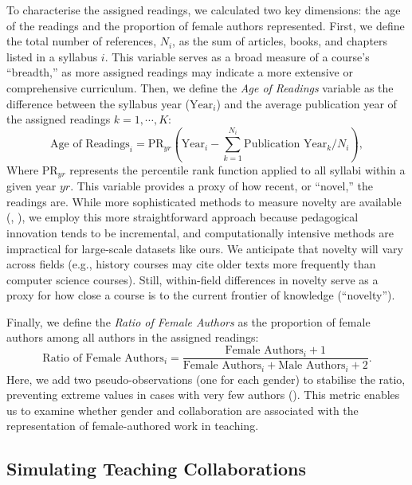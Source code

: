 \documentclass[
  12pt,
]{article}
\begin{document}
To characterise the assigned readings, we calculated two key dimensions: the age of the readings and the proportion of female authors represented. First, we define the total number of references, \(N_i\), as the sum of articles, books, and chapters listed in a syllabus \(i\). This variable serves as a broad measure of a course's ``breadth,'' as more assigned readings may indicate a more extensive or comprehensive curriculum. Then, we define the \emph{Age of Readings} variable as the difference between the syllabus year (\(\text{Year}_i\)) and the average publication year of the assigned readings \(k=1,\cdots,K\):\\
\[
  \text{Age of Readings}_i = \text{PR}_{yr}\left(\text{Year}_i - \sum_{k=1}^{N_i} \text{Publication Year}_k / N_i\right),
\]
Where \(\text{PR}_{yr}\) represents the percentile rank function applied to all syllabi within a given year \(yr\). This variable provides a proxy of how recent, or ``novel,'' the readings are. While more sophisticated methods to measure novelty are available (, ), we employ this more straightforward approach because pedagogical innovation tends to be incremental, and computationally intensive methods are impractical for large-scale datasets like ours. We anticipate that novelty will vary across fields (e.g., history courses may cite older texts more frequently than computer science courses). Still, within-field differences in novelty serve as a proxy for how close a course is to the current frontier of knowledge (``novelty'').

Finally, we define the \emph{Ratio of Female Authors} as the proportion of female authors among all authors in the assigned readings:
\[
  \text{Ratio of Female Authors}_i = \frac{\text{Female Authors}_i + 1} {\text{Female Authors}_i + \text{Male Authors}_i + 2}.
\]
Here, we add two pseudo-observations (one for each gender) to stabilise the ratio, preventing extreme values in cases with very few authors (). This metric enables us to examine whether gender and collaboration are associated with the representation of female-authored work in teaching.

\subsection{Simulating Teaching Collaborations}\label{simulating-teaching-collaborations}
\end{document}
